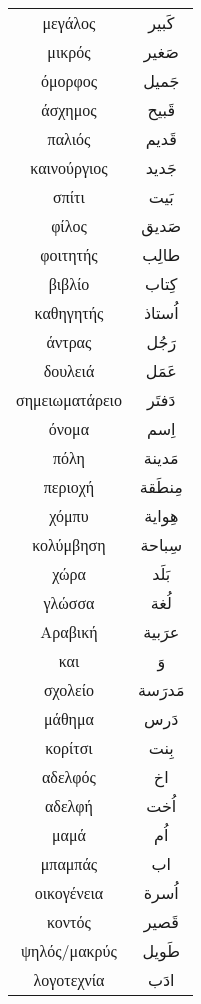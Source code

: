 \documentclass[twocolumn,a4paper]{article}
\newcommand{\ar}[1]{\textarabic{#1}}
\begin{document}
\renewcommand*{\arraystretch}{3}
\begin{supertabular}{ c c }

μεγάλος     & \ar{ كَبير } \\
μικρός      & \ar{ صَغير } \\
όμορφος     & \ar{ جَميل } \\
άσχημος     & \ar{ قَبيح } \\
παλιός      & \ar{ قَديم } \\
καινούργιος & \ar{ جَديد } \\
σπίτι       & \ar{ بَيت } \\
φίλος       & \ar{ صَديق } \\
φοιτητής    & \ar{ طالِب } \\
βιβλίο      & \ar{ كِتاب } \\
καθηγητής   & \ar{ اُستاذ} \\
άντρας      & \ar{ رَجُل } \\
δουλειά     & \ar{ عَمَل } \\
σημειωματάρειο & \ar{ دَفتَر } \\
όνομα       & \ar{اِسم } \\
πόλη        & \ar{ مَدينة } \\
περιοχή     & \ar{ مِنطَقة } \\
χόμπυ       & \ar{ هِواية } \\
κολύμβηση   & \ar{ سِباحة } \\
χώρα        & \ar{ بَلَد } \\
γλώσσα      & \ar{ لُغة } \\
Αραβική     & \ar{ عرَبية } \\
και         & \ar{ وَ } \\
σχολείο     & \ar{ مَدرَسة } \\
μάθημα      & \ar{ دَرس } \\
κορίτσι     & \ar{ بِنت } \\
αδελφός     & \ar{ اخ } \\
αδελφή      & \ar{ اُخت } \\
μαμά        & \ar{ اُم} \\
μπαμπάς     & \ar{ اب } \\
οικογένεια  & \ar{ اُسرة } \\
κοντός      & \ar{ قَصير } \\
ψηλός/μακρύς & \ar{ طَويل } \\
λογοτεχνία  & \ar{ ادَب } \\

\end{supertabular}
\end{document}
